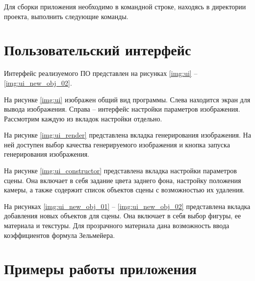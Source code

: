         Для сборки приложения необходимо в командной строке, находясь в директории проекта, выполнить следующие команды.
        

    \section{Пользовательский интерфейс}
    
        Интерфейс реализуемого ПО представлен на рисунках \ref{img:ui} – \ref{img:ui_new_obj_02}.

        
        На рисунке \ref{img:ui} изображен общий вид программы. Слева находится экран для вывода изображения. Справа -- интерфейс настройки параметров изображения. Рассмотрим каждую из вкладок настройки отдельно.
        
        
        На рисунке \ref{img:ui_render} представлена вкладка генерирования изображения. На ней доступен выбор качества генерируемого изображения и кнопка запуска генерирования изображения.
        
        
        На рисунке \ref{img:ui_constructor} представлена вкладка настройки параметров сцены. Она включает в себя задание цвета заднего фона, настройку положения камеры, а также содержит список объектов сцены с возможностью их удаления.
        
        
        
        На рисунках \ref{img:ui_new_obj_01} -- \ref{img:ui_new_obj_02} представлена вкладка добавления новых объектов для сцены. Она включает в себя выбор фигуры, ее материала и текстуры. Для прозрачного материала дана возможность ввода коэффициентов формула Зельмейера.
    
    \clearpage
        
    \section{Примеры работы приложения}
    
